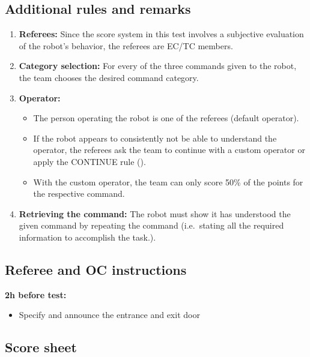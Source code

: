 \subsection{Additional rules and remarks}
\label{sec:gpsr_remarks}
\begin{enumerate}
	\item \textbf{Referees:} Since the score system in this test involves a subjective evaluation of the robot's behavior, the referees are EC/TC members.

	\item \textbf{Category selection:} For every of the three commands given to the robot, the team chooses the desired command category.

	\item \textbf{Operator:}
	\begin{itemize}
		\item The person operating the robot is one of the referees (default operator).
		\item If the robot appears to consistently not be able to understand the operator, the referees ask the team to continue with a custom operator or apply the CONTINUE rule (). 
		\item With the custom operator, the team can only score 50\% of the points for the respective command.
	\end{itemize}

	\item \textbf{Retrieving the command:} The robot must show it has understood the given command by repeating the command (i.e.~stating all the required information to accomplish the task.).
\end{enumerate}

\subsection{Referee and OC instructions}
\textbf{2h before test:}
\begin{itemize}
	\item Specify and announce the entrance and exit door
\end{itemize}

\newpage
\subsection{Score sheet}


